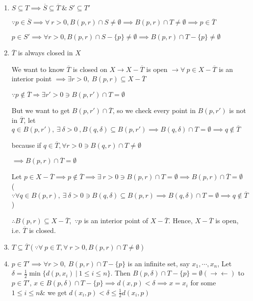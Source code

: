 \begin{enumerate}[wide,label=\textbf{(\arabic*). }]
	\item $S \subseteq T \implies \overline{S} \subseteq \overline{T} ~\&~ S' \subseteq T'$
	 
	$\because p \in \overline{S} \implies \forall~ r>0,B(p,r) \cap S \neq \emptyset \implies B(p,r) \cap T \neq \emptyset \implies p \in \overline{T}$
	
	$p \in S' \implies \forall r > 0,B(p,r)\cap S - \{p\} \neq \emptyset \implies B(p,r) \cap T - \{p\} \neq \emptyset$
	
	\item $\overline{T}$ is always closed in $X$
	
	\begin{tcolorbox}
		We want to know $\overline{T}$ is closed on $X \rightarrow X - \overline{T}$ is open $\rightarrow \forall~p \in X - \overline{T}$ is an interior point $\implies \exists r > 0,~B(p,r) \subseteq X - \overline{T}$
		
		$\because p \notin \overline{T} \Rightarrow \exists r' > 0 \ni B(p,r') \cap T = \emptyset$
		
		But we want to get $B(p,r') \cap \overline{T}$, so we check every point in $B(p,r')$ is not in $\overline{T}$, let $q \in B(p,r') ,~\exists ~\delta > 0 ~,B(q,\delta) \subseteq B(p,r') \implies B(q,\delta) \cap T = \emptyset \implies q \notin \overline{T}$
		
		because if $q \in \overline{T},\forall r > 0 \ni B(q,r) \cap T \neq \emptyset$
		
		$\implies B(p,r) \cap \overline{T} = \emptyset$
	\end{tcolorbox}
	
	Let $p \in X - \overline{T} \implies p \notin \overline{T} \implies \exists~r>0 \ni B(p,r) \cap T = \emptyset \implies B(p,r) \cap \overline{T} = \emptyset$ ($\because \forall q \in B(p,r),~\exists~\delta > 0 \ni B(q,\delta) \subseteq B(p,r) \implies B(q,\delta) \cap T = \emptyset \implies q \notin \overline{T}$)
	
	$\therefore B(p,r) \subseteq X - \overline{T}$,~$\because p$ is an interior point of $X - \overline{T}$. Hence, $X - \overline{T}$ is open, i.e. $\overline{T}$ is closed.
	
	\item $T \subseteq \overline{T}(\because \forall~p \in T, \forall ~ r > 0,B(p,r) \cap T \neq \emptyset)$
	
	\item $p \in T' \implies \forall r > 0,~ B(p,r) \cap T - \{p\}$ is an infinite set, say $x_1,\cdots,x_n$, Let $\delta = \frac{1}{2} \min \{d(p,x_i)~|~1\leq i \leq n\}$. Then $B(p,\delta) \cap T - \{p\} = \emptyset (\rightarrow\leftarrow)$ to $p \in T'$, $x \in B(p,\delta) \cap T - \{p\} \implies d(x,p) < \delta \implies x = x_i$ for some $1 \leq i \leq n \&$ we get $d(x_i,p) < \delta \leq \frac{1}{2}d(x_i,p)$
	

\end{enumerate}
